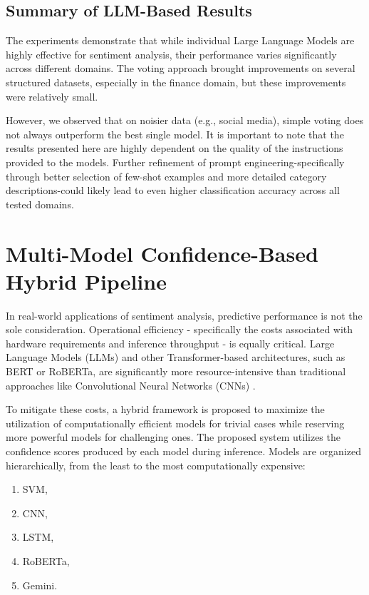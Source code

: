 \documentclass[conference]{IEEEtran}
\begin{document}
\subsection{Summary of LLM-Based Results}

The experiments demonstrate that while individual Large Language Models are highly effective for sentiment analysis, their performance varies significantly across different domains. The voting approach brought improvements on several structured datasets, especially in the finance domain, but these improvements were relatively small.

However, we observed that on noisier data (e.g., social media), simple voting does not always outperform the best single model. It is important to note that the results presented here are highly dependent on the quality of the instructions provided to the models. Further refinement of prompt engineering-specifically through better selection of few-shot examples and more detailed category descriptions-could likely lead to even higher classification accuracy across all tested domains.

\section{Multi-Model Confidence-Based Hybrid Pipeline}
In real-world applications of sentiment analysis, predictive performance is not the sole consideration. Operational efficiency - specifically the costs associated with hardware requirements and inference throughput - is equally critical. Large Language Models (LLMs) and other Transformer-based architectures, such as BERT or RoBERTa, are significantly more resource-intensive than traditional approaches like Convolutional Neural Networks (CNNs) \cite{zhang2024sentiment} \cite{sa-in-age-of-genai}.

To mitigate these costs, a hybrid framework is proposed to maximize the utilization of computationally efficient models for trivial cases while reserving more powerful models for challenging ones. The proposed system utilizes the confidence scores produced by each model during inference. Models are organized hierarchically, from the least to the most computationally expensive:

\begin{enumerate}
    \item SVM,
    \item CNN,
    \item LSTM,
    \item RoBERTa,
    \item Gemini.
\end{enumerate}
\end{document}
